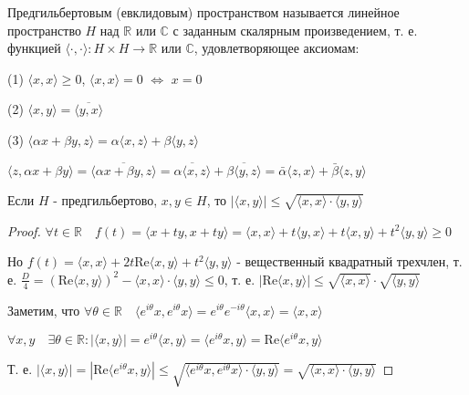 \documentclass[a4paper,12pt]{report}
\begin{document}
\begin{df}
Предгильбертовым (евклидовым) пространством называется линейное пространство $H$ над $\mathbb R$ или $\mathbb C$ с заданным скалярным произведением, т. е. функцией $\langle\cdot,\cdot\rangle\colon H\times H\to\mathbb R$ или $\mathbb C$, удовлетворяющее аксиомам:

(1) $\langle x,x\rangle\ge0$, $\langle x,x\rangle=0$ $\Leftrightarrow$ $x=0$

(2) $\langle x,y\rangle=\overline{\langle y,x\rangle}$

(3) $\langle\alpha x+\beta y,z\rangle=\alpha\langle x,z\rangle+\beta\langle y,z\rangle$
\end{df}
 


\begin{rem}
$\langle z,\alpha x+\beta y\rangle=\overline{\langle\alpha x+\beta y,z\rangle}=\overline{\alpha\langle x,z\rangle}+\overline{\beta\langle y,z\rangle}=\bar\alpha\langle z,x\rangle+\bar\beta\langle z,y\rangle$
\end{rem}
 


\begin{thm}
Если $H$ - предгильбертово, $x,y\in H$, то $|\langle x,y\rangle|\le\sqrt{\langle x,x\rangle\cdot\langle y,y\rangle}$
\end{thm}
\begin{proof}
$\forall t\in\mathbb R\quad f(t)=\langle x+ty,x+ty\rangle=\langle x,x\rangle+t\langle y,x\rangle+t\langle x,y\rangle+t^2\langle y, y\rangle\ge0$

Но $f(t)=\langle x,x\rangle+2t\mathrm{Re}\langle x,y\rangle+t^2\langle y,y\rangle$ - вещественный квадратный трехчлен, т. е. $\frac{D}4=\left(\mathrm{Re}\langle x,y\rangle\right)^2-\langle x,x\rangle\cdot\langle y,y\rangle\le0$, т. е. $|\mathrm{Re}\langle x,y\rangle|\le\sqrt{\langle x,x\rangle}\cdot\sqrt{\langle y,y\rangle}$

Заметим, что $\forall\theta\in\mathbb R\quad\langle e^{i\theta}x,e^{i\theta}x\rangle=e^{i\theta}e^{-i\theta}\langle x,x\rangle=\langle x,x\rangle$

$\forall x,y\quad\exists\theta\in\mathbb R\colon|\langle x,y\rangle|=e^{i\theta}\langle x,y\rangle=\langle e^{i\theta}x,y\rangle=\mathrm{Re}\langle e^{i\theta}x,y\rangle$

Т. е. $|\langle x,y\rangle|=|\mathrm{Re}\langle e^{i\theta}x,y\rangle|\le\sqrt{\langle e^{i\theta}x,e^{i\theta}x\rangle\cdot\langle y,y\rangle}=\sqrt{\langle x,x\rangle\cdot\langle y,y\rangle}$
\end{proof}
 
\end{document}
